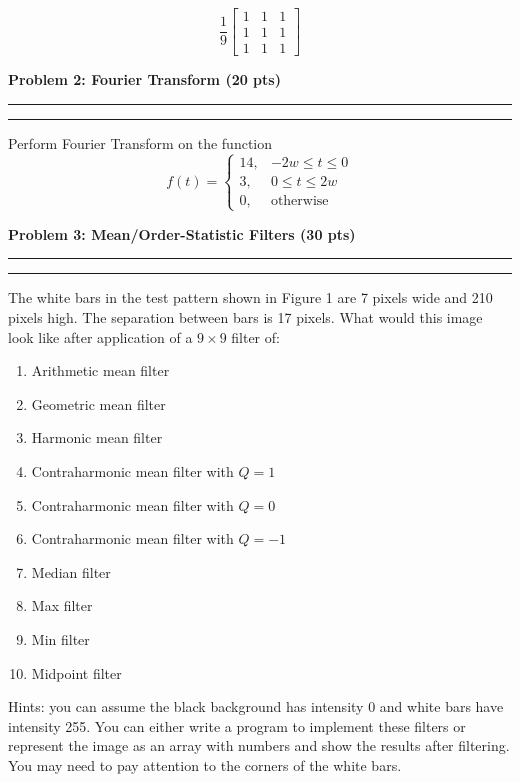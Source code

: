 \documentclass[12pt]{article}
\newcommand{\question}[1]{%
  \clearpage
  \vspace{0.5cm}
  {\noindent\normalsize \textbf{#1}}
  \vspace{0.2cm}
  \hrule
  \vspace{0.1cm}
  \hrule
  \vspace{0.3cm}
}
\begin{document}
\[
\frac{1}{9}
\begin{bmatrix}
1 & 1 & 1 \\
1 & 1 & 1 \\
1 & 1 & 1
\end{bmatrix}
\]


\question{Problem 2: Fourier Transform (20 pts)}\label{quest:2}

Perform Fourier Transform on the function
\[
f(t) =
\begin{cases}
14, & -2w \le t \le 0 \\
3,  & 0 \le t \le 2w \\
0,  & \text{otherwise}
\end{cases}
\]


\question{Problem 3: Mean/Order-Statistic Filters (30 pts)}\label{quest:3}

The white bars in the test pattern shown in Figure 1 are 7 pixels wide and 210 pixels high.
The separation between bars is 17 pixels. What would this image look like after application of a
$9 \times 9$ filter of:

\begin{enumerate}[label=(\alph*)]
\item Arithmetic mean filter
\item Geometric mean filter
\item Harmonic mean filter
\item Contraharmonic mean filter with $Q=1$
\item Contraharmonic mean filter with $Q=0$
\item Contraharmonic mean filter with $Q=-1$
\item Median filter
\item Max filter
\item Min filter
\item Midpoint filter
\end{enumerate}

Hints: you can assume the black background has intensity 0 and white bars have intensity 255.
You can either write a program to implement these filters or represent the image as an array with
numbers and show the results after filtering. You may need to pay attention to the corners of the white bars.
\end{document}
